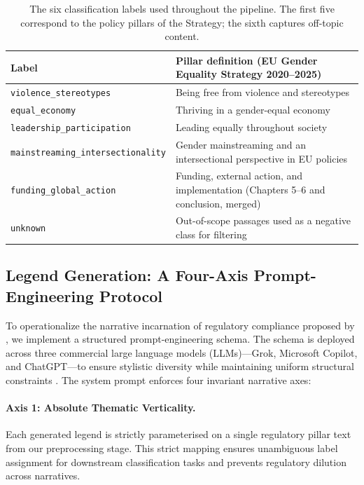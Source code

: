 \documentclass[pdflatex,sn-mathphys-num]{sn-jnl}%
\theoremstyle{thmstyleone}%
\theoremstyle{thmstyletwo}%
\theoremstyle{thmstylethree}%
\begin{document}
\begin{table}[htbp]
\centering
\caption{The six classification labels used throughout the pipeline. The first five correspond to the policy pillars of the Strategy; the sixth captures off-topic content.}
\label{tab:labels}
\vspace{2mm}
\begin{tabular}{p{4.2cm} p{7.3cm}}
\toprule
\textbf{Label} & \textbf{Pillar definition (EU Gender Equality Strategy
2020--2025)} \\
\midrule
\texttt{violence\_stereotypes} & Being free from violence and stereotypes \\
\addlinespace
\texttt{equal\_economy} & Thriving in a gender-equal economy \\
\addlinespace
\texttt{leadership\_participation} & Leading equally throughout society \\
\addlinespace
\texttt{mainstreaming\_intersectionality} & Gender mainstreaming and an
intersectional perspective in EU policies \\
\addlinespace
\texttt{funding\_global\_action} & Funding, external action, and implementation
(Chapters 5--6 and conclusion, merged) \\
\addlinespace
\texttt{unknown} & Out-of-scope passages used as a negative class for filtering
\\
\bottomrule
\end{tabular}
\end{table}

\subsection{Legend Generation: A Four-Axis Prompt-Engineering Protocol}

To operationalize the narrative incarnation of regulatory compliance proposed by
\citet{sargsyan2025compliance}, we implement a structured prompt-engineering
schema. The schema is deployed across three commercial large language models
(LLMs)—Grok, Microsoft Copilot, and ChatGPT—to ensure stylistic diversity while
maintaining uniform structural constraints \citep{guo2024diversity}. The system
prompt enforces four invariant narrative axes:

\paragraph{Axis 1: Absolute Thematic Verticality.} Each generated legend is
strictly parameterised on a single regulatory pillar text from our preprocessing
stage. This strict mapping ensures unambiguous label assignment for downstream
classification tasks and prevents regulatory dilution across narratives.
\end{document}
